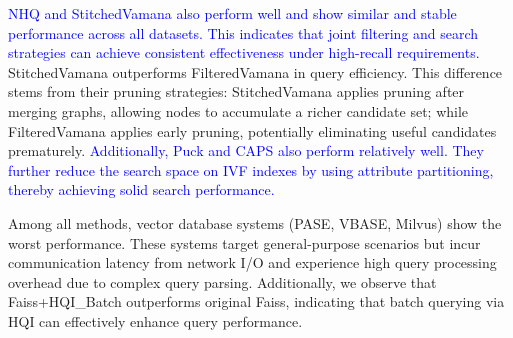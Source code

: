 \documentclass[sigconf, nonacm]{acmart}
\begin{document}
{	\textcolor{blue}{NHQ and StitchedVamana also perform well and show similar and stable performance across all datasets. This indicates that joint filtering and search strategies can achieve consistent effectiveness under high-recall requirements.} StitchedVamana outperforms FilteredVamana in query efficiency. This difference stems from their pruning strategies: StitchedVamana applies pruning after merging graphs, allowing nodes to accumulate a richer candidate set; while FilteredVamana applies early pruning, potentially eliminating useful candidates prematurely.
	\textcolor{blue}{Additionally, Puck and CAPS also perform relatively well. They further reduce the search space on IVF indexes by using attribute partitioning, thereby achieving solid search performance.}
	
	Among all methods, vector database systems (PASE, VBASE, Milvus) show the worst performance. These systems target general-purpose scenarios but incur communication latency from network I/O and experience high query processing overhead due to complex query parsing. Additionally, we observe that Faiss+HQI\_Batch outperforms original Faiss, indicating that batch querying via HQI can effectively enhance query performance.
	
	
}
\end{document}
